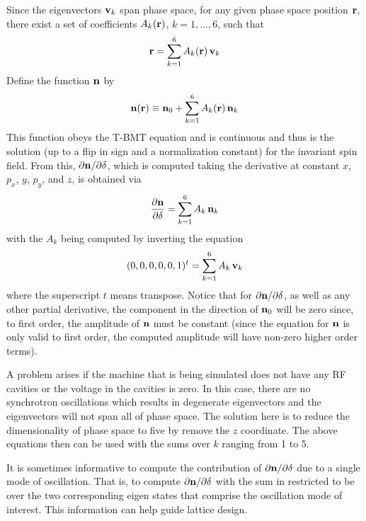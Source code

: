 Since the eigenvectors ${\bf v}_k$ span phase space, for any given phase space position ${\bf r}$, there
exist a set of coefficients $A_k({\bf r})$, $k = 1, \ldots, 6$, such that
\begin{equation}
  {\bf r} = \sum_{k = 1}^6 A_k({\bf r}) \, {\bf v}_k
\end{equation}
Define the function ${\bf n}$ by
\begin{equation}
  {\bf n}({\bf r}) \equiv {\bf n}_0 + \sum_{k = 1}^6 A_k({\bf r}) \, {\bf n}_k
  \label{nrn0}
\end{equation}
This function obeys the T-BMT equation and is continuous and thus is the solution (up to a flip in
sign and a normalization constant) for the invariant spin field. From this, ${\partial
{\bf n}}/\partial \delta$, which is computed taking the derivative at constant $x$, $p_x$, $y$, $p_y$,
and $z$, is obtained via
\begin{equation}
  \frac{\partial {\bf n}}{\partial \delta} = 
  \sum_{k = 1}^6 A_k \, {\bf n}_k
  \label{ndan}
\end{equation}
with the $A_k$ being computed by inverting the equation
\begin{equation}
  (0, 0, 0, 0, 0, 1)^t = \sum_{k = 1}^6 A_k \, {\bf v}_k
  \label{000001}
\end{equation}
where the superscript $t$ means transpose. Notice that for ${\partial {\bf n}}/\partial \delta$, as
well as any other partial derivative, the component in the direction of ${\bf n}_0$ will be zero since,
to first order, the amplitude of ${\bf n}$ must be constant (since the equation for ${\bf n}$ is only
valid to first order, the computed amplitude will have non-zero higher order terms).

A problem arises if the machine that is being simulated does not have any RF cavities or the voltage
in the cavities is zero. In this case, there are no synchrotron oscillations which results in
degenerate eigenvectors and the eigenvectors will not span all of phase space. The solution here
is to reduce the dimensionality of phase space to five by remove the $z$ coordinate. The above
equations then can be used with the sums over $k$ ranging from 1 to 5. 

It is sometimes informative to compute the contribution of ${\partial {\bf n}}/\partial \delta$ due to
a single mode of oscillation. That is, to compute ${\partial {\bf n}}/\partial \delta$ with the sum in
 restricted to be over the two corresponding eigen states that comprise the oscillation
mode of interest. This information can help guide lattice design.

